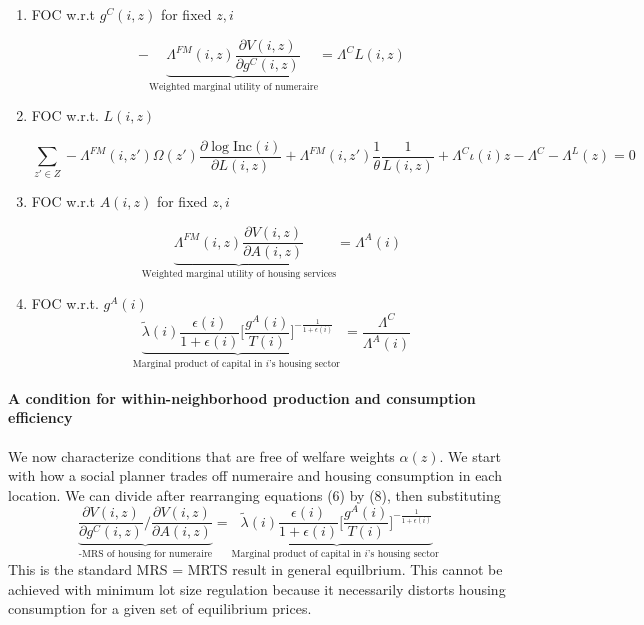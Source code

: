 \documentclass[11pt]{article}
\begin{document}
	\begin{enumerate}
		\item FOC w.r.t $g^{C}(i, z)$ for fixed $z, i$
		
		\begin{equation}
		  -\underbrace{\Lambda^{FM}(i, z)\frac{\partial V(i, z)}{\partial g^{C}(i, z)}}_{\text{Weighted marginal utility of numeraire}}  = \Lambda^{C}L(i, z)
		\end{equation}
		
		\item FOC w.r.t. $L(i, z)$ 
		
		\begin{equation}
			\sum_{z' \in Z}-\Lambda^{FM}(i, z')\Omega(z')\frac{\partial \log \text{Inc}(i)}{\partial L(i, z)} + \Lambda^{FM}(i, z')\frac{1}{\theta}\frac{1}{L(i, z)} + \Lambda^{C}\iota(i)z - \Lambda^{C} - \Lambda^{L}(z) = 0
		\end{equation}




		\item FOC w.r.t $A(i, z)$ for fixed $z, i$
		
		\begin{equation}
				 \underbrace{\Lambda^{FM}(i, z)\frac{\partial V(i, z)}{\partial A(i, z)}}_{\text{Weighted marginal utility of housing services}} = \Lambda^{A}(i)
		\end{equation}
		
		\item FOC w.r.t. $g^{A}(i)$ 
		\begin{equation}
			\underbrace{ \tilde{\lambda}(i)\frac{\epsilon(i)}{1 + \epsilon(i)} \bigg[\frac{g^{A}(i)}{T(i)} \bigg]^{-\frac{1}{1 + \epsilon(i)}}}_{\text{Marginal product of capital in $i$'s housing sector }} = \frac{\Lambda^{C}}{\Lambda^{A}(i)}
		\end{equation}

	\end{enumerate}
		
		
	\paragraph{A condition for within-neighborhood production and consumption efficiency} We now characterize conditions that are free of welfare weights $\alpha(z)$. We start with how a social planner trades off numeraire and housing consumption in each location. We can divide after rearranging equations (6) by (8), then substituting 
	\begin{equation}
	\underbrace{\frac{\partial V(i, z)}{\partial g^{C}(i, z)}/\frac{\partial V(i, z)}{\partial A(i, z)}}_{\text{-MRS of housing for numeraire}} = 	\underbrace{ \tilde{\lambda}(i)\frac{\epsilon(i)}{1 + \epsilon(i)} \bigg[\frac{g^{A}(i)}{T(i)} \bigg]^{-\frac{1}{1 + \epsilon(i)}}}_{\text{Marginal product of capital in $i$'s housing sector }}
	\end{equation}
	This is the standard MRS = MRTS result in general equilbrium. This cannot be achieved with minimum lot size regulation because it necessarily distorts housing consumption for a given set of equilibrium prices. 
	
\end{document}
